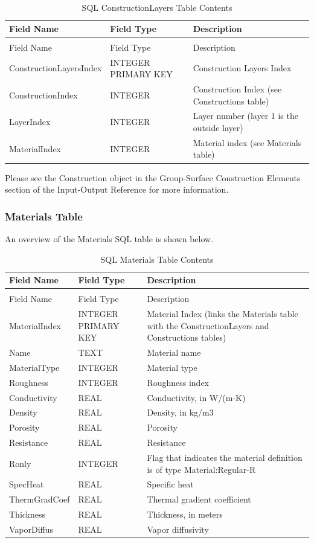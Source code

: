 \begin{longtable}[c]{>{\raggedright}p{1.52in}>{\raggedright}p{1.5in}>{\raggedright}p{2.98in}}
\caption{SQL ConstructionLayers Table Contents \label{table:table-27.-sql-constructionlayers-table}} \tabularnewline
\toprule
Field Name & Field Type & Description \tabularnewline
\midrule
\endfirsthead

\caption[]{SQL ConstructionLayers Table Contents} \tabularnewline
\toprule
Field Name & Field Type & Description \tabularnewline
\midrule
\endhead

Construction\-Layers\-Index & INTEGER PRIMARY KEY & Construction Layers Index \tabularnewline
Construction\-Index & INTEGER & Construction Index (see Constructions table) \tabularnewline
LayerIndex & INTEGER & Layer number (layer 1 is the outside layer) \tabularnewline
MaterialIndex & INTEGER & Material index (see Materials table) \tabularnewline
\bottomrule
\end{longtable}

Please see the Construction object in the Group-Surface Construction Elements section of the Input-Output Reference for more information.

\subsubsection{Materials Table}

An overview of the Materials SQL table is shown below.

\begin{longtable}[c]{>{\raggedright}p{1.5in}>{\raggedright}p{1.5in}>{\raggedright}p{3.0in}}
\caption{SQL Materials Table Contents \label{table:table-28.-sql-materials-table-contents}} \tabularnewline
\toprule
Field Name & Field Type & Description \tabularnewline
\midrule
\endfirsthead

\caption[]{SQL Materials Table Contents} \tabularnewline
\toprule
Field Name & Field Type & Description \tabularnewline
\midrule
\endhead

MaterialIndex & INTEGER PRIMARY KEY & Material Index (links the Materials table with the ConstructionLayers and Constructions tables) \tabularnewline
Name & TEXT & Material name \tabularnewline
MaterialType & INTEGER & Material type \tabularnewline
Roughness & INTEGER & Roughness index \tabularnewline
Conductivity & REAL & Conductivity, in W/(m-K) \tabularnewline
Density & REAL & Density, in kg/m3 \tabularnewline
Porosity & REAL & Porosity \tabularnewline
Resistance & REAL & Resistance \tabularnewline
Ronly & INTEGER & Flag that indicates the material definition is of type Material:Regular-R \tabularnewline
SpecHeat & REAL & Specific heat \tabularnewline
ThermGrad\-Coef & REAL & Thermal gradient coefficient \tabularnewline
Thickness & REAL & Thickness, in meters \tabularnewline
VaporDiffus & REAL & Vapor diffusivity \tabularnewline
\bottomrule
\end{longtable}


